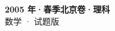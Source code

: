 \documentclass[zihao=-4, a4paper]{ctexart}
\begin{document}
\begin{center}
  {\Large\bfseries 2005 年·春季北京卷·理科}\\[4pt]
  {\large 数学 · 试题版}
\end{center}
\medskip
{}

\end{document}
